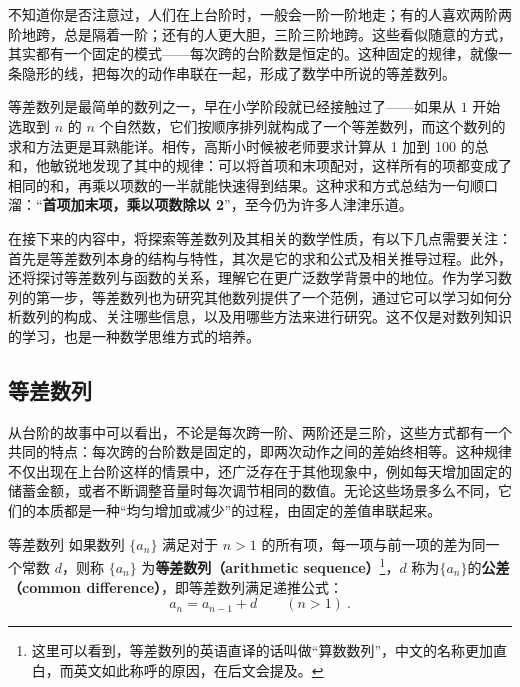
% 


不知道你是否注意过，人们在上台阶时，一般会一阶一阶地走；有的人喜欢两阶两阶地跨，总是隔着一阶；还有的人更大胆，三阶三阶地跨。这些看似随意的方式，其实都有一个固定的模式——每次跨的台阶数是恒定的。这种固定的规律，就像一条隐形的线，把每次的动作串联在一起，形成了数学中所说的等差数列。

等差数列是最简单的数列之一，早在小学阶段就已经接触过了——如果从 $1$ 开始选取到  $n$  的  $n$  个自然数，它们按顺序排列就构成了一个等差数列，而这个数列的求和方法更是耳熟能详。相传，高斯小时候被老师要求计算从 1 加到 100 的总和，他敏锐地发现了其中的规律：可以将首项和末项配对，这样所有的项都变成了相同的和，再乘以项数的一半就能快速得到结果。这种求和方式总结为一句顺口溜：“\textbf{首项加末项，乘以项数除以 2}”，至今仍为许多人津津乐道。

在接下来的内容中，将探索等差数列及其相关的数学性质，有以下几点需要关注：首先是等差数列本身的结构与特性，其次是它的求和公式及相关推导过程。此外，还将探讨等差数列与函数的关系，理解它在更广泛数学背景中的地位。作为学习数列的第一步，等差数列也为研究其他数列提供了一个范例，通过它可以学习如何分析数列的构成、关注哪些信息，以及用哪些方法来进行研究。这不仅是对数列知识的学习，也是一种数学思维方式的培养。

\subsection{等差数列}\label{sub_HsAmPg_1}

从台阶的故事中可以看出，不论是每次跨一阶、两阶还是三阶，这些方式都有一个共同的特点：每次跨的台阶数是固定的，即两次动作之间的差始终相等。这种规律不仅出现在上台阶这样的情景中，还广泛存在于其他现象中，例如每天增加固定的储蓄金额，或者不断调整音量时每次调节相同的数值。无论这些场景多么不同，它们的本质都是一种“均匀增加或减少”的过程，由固定的差值串联起来。

\begin{definition}{等差数列}\label{def_HsAmPg_1}
如果数列 $\{a_n\}$ 满足对于 $n > 1$ 的所有项，每一项与前一项的差为同一个常数 $d$，则称 $\{a_n\}$ 为\textbf{等差数列（arithmetic sequence）}\footnote{这里可以看到，等差数列的英语直译的话叫做“算数数列”，中文的名称更加直白，而英文如此称呼的原因，在后文会提及。}，$d$ 称为$\{a_n\}$的\textbf{公差（common difference）}，即等差数列满足递推公式：
\begin{equation}
a_{n}=a_{n-1}+d\qquad(n>1)~.
\end{equation}
\end{definition}

